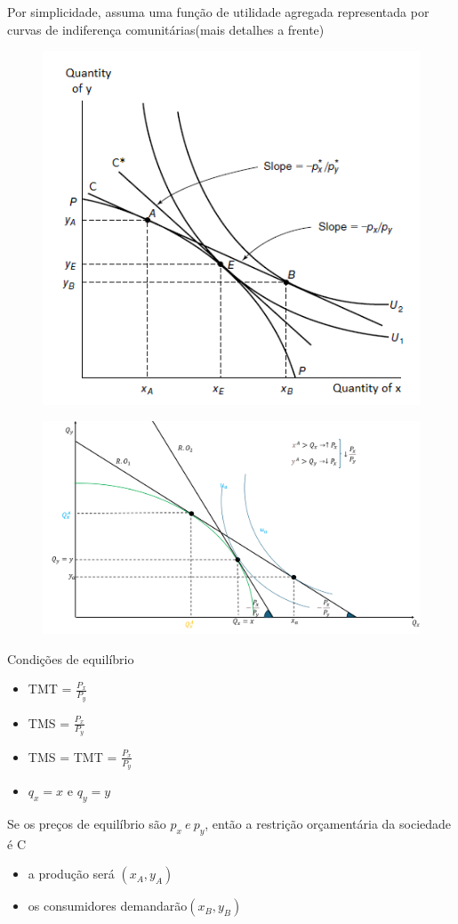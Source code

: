 \documentclass[a4paper,12pt]{article}[abntex2]
\begin{document}
Por simplicidade, assuma uma função de utilidade agregada representada por curvas de indiferença comunitárias(mais detalhes a frente)

\begin{figure}[H]
    \centering
    \includegraphics[width=0.70\linewidth]{Imagens/a3i4.png}
\end{figure}

\begin{figure}[H]
    \centering
    \includegraphics[width=0.7\linewidth]{Imagens/a5i7.png}
\end{figure}

Condições de equilíbrio\begin{itemize}
    \item TMT = \(\frac{P_x}{P_y}\)
    \item TMS = \(\frac{P_x}{P_y}\)
    \item TMS = TMT = \(\frac{P_x}{P_y}\)
    \item \(q_x=x\) e \(q_y=y\)
\end{itemize}

Se os preços de equilíbrio são $p_x \ e\ p_y$, então a restrição orçamentária da sociedade é C\begin{itemize}
    \item a produção será $(x_A,y_A)$
    \item os consumidores demandarão$(x_B,y_B)$
\end{itemize}
\end{document}
